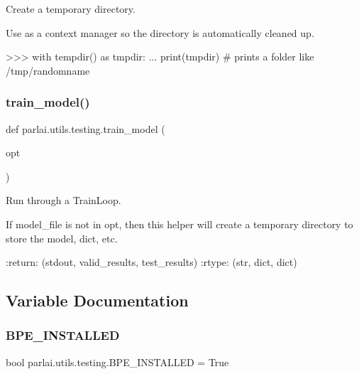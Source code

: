 \begin{DoxyVerb}Create a temporary directory.

Use as a context manager so the directory is automatically cleaned up.

>>> with tempdir() as tmpdir:
...    print(tmpdir)  # prints a folder like /tmp/randomname
\end{DoxyVerb}
 \mbox{\label{namespaceparlai_1_1utils_1_1testing_a005734981469efed8a992bf5edc3ca8a}} 
\subsubsection{\texorpdfstring{train\+\_\+model()}{train\_model()}}
{\footnotesize\ttfamily def parlai.\+utils.\+testing.\+train\+\_\+model (\begin{DoxyParamCaption}\item[{}]{opt }\end{DoxyParamCaption})}

\begin{DoxyVerb}Run through a TrainLoop.

If model_file is not in opt, then this helper will create a temporary
directory to store the model, dict, etc.

:return: (stdout, valid_results, test_results)
:rtype: (str, dict, dict)
\end{DoxyVerb}
 

\subsection{Variable Documentation}
\mbox{\label{namespaceparlai_1_1utils_1_1testing_a54ab3fcb6f56b6b83d27ed5aa62148da}} 
\subsubsection{\texorpdfstring{B\+P\+E\+\_\+\+I\+N\+S\+T\+A\+L\+L\+ED}{BPE\_INSTALLED}}
{\footnotesize\ttfamily bool parlai.\+utils.\+testing.\+B\+P\+E\+\_\+\+I\+N\+S\+T\+A\+L\+L\+ED = True}

